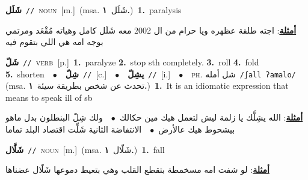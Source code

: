 \documentclass[10pt,a4paper,twoside]{article} %
\begin{document}
\begin{multicols}{2}
{\setlength\topsep{0pt}\textbf{\foreignlanguage{arabic}{شَلَل}}\ {\color{gray}\texttt{//}\color{black}}\ \textsc{noun}\ [m.]\ \color{gray}(msa. \foreignlanguage{arabic}{شَلَل}~\foreignlanguage{arabic}{\textbf{١.}})\color{black}\ \textbf{1.}~paralysis\  \begin{flushright}\color{gray}\foreignlanguage{arabic}{\textbf{\underline{\foreignlanguage{arabic}{أمثلة}}}: اجته طلقة عظهره ويا حرام من ال 2002 معه شَلَل كامل وهياته مُقْعَد ومرتمي بوجه امه هي اللي بتقوم فيه}\end{flushright}\color{black}} \vspace{2mm}

{\setlength\topsep{0pt}\textbf{\foreignlanguage{arabic}{شَلّ}}\ {\color{gray}\texttt{//}\color{black}}\ \textsc{verb}\ [p.]\ \textbf{1.}~paralyze  \textbf{2.}~stop sth completely.  \textbf{3.}~roll  \textbf{4.}~fold  \textbf{5.}~shorten\ \ $\bullet$\ \ \setlength\topsep{0pt}\textbf{\foreignlanguage{arabic}{شِلّ}}\ {\color{gray}\texttt{//}\color{black}}\ [c.]\ \ $\bullet$\ \ \setlength\topsep{0pt}\textbf{\foreignlanguage{arabic}{يشِلّ}}\ {\color{gray}\texttt{//}\color{black}}\ [i.]\ \ $\bullet$\ \ \textsc{ph.} \color{gray} \foreignlanguage{arabic}{شل أمله}\color{black}\ {\color{gray}\texttt{/{\sffamily ʃall ʔamalo}/}\color{black}}\ \color{gray} (msa. \foreignlanguage{arabic}{تحدث عن شخص بطريقة سيئة}~\foreignlanguage{arabic}{\textbf{١.}})\color{black}\ \textbf{1.}~It is an idiomatic expression that means to speak ill of sb\  \begin{flushright}\color{gray}\foreignlanguage{arabic}{\textbf{\underline{\foreignlanguage{arabic}{أمثلة}}}: الله يشِلَّك يا زلمة ليش لتعمل هيك مين حكالك\ $\bullet$\ \  ولك شِلّ البنطلون بدل ماهو بيشحوط هيك عالأرض\ $\bullet$\ \  الانتفاضة الثانية شَلِّت اقتصاد البلد تماما}\end{flushright}\color{black}} \vspace{2mm}

{\setlength\topsep{0pt}\textbf{\foreignlanguage{arabic}{شَلَّال}}\ {\color{gray}\texttt{//}\color{black}}\ \textsc{noun}\ [m.]\ \color{gray}(msa. \foreignlanguage{arabic}{شَلّال}~\foreignlanguage{arabic}{\textbf{١.}})\color{black}\ \textbf{1.}~fall\  \begin{flushright}\color{gray}\foreignlanguage{arabic}{\textbf{\underline{\foreignlanguage{arabic}{أمثلة}}}: لو شفت امه مسخمطة بتقطع القلب وهي بتعيط دموعها شَلّال عضناها}\end{flushright}\color{black}} \vspace{2mm}


\end{multicols}
\end{document}
